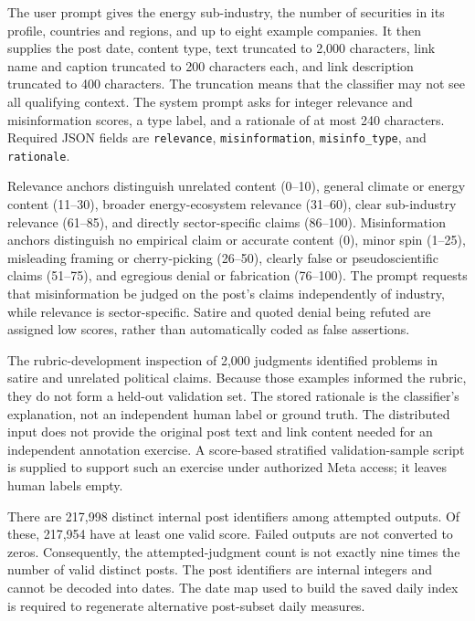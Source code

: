 \documentclass[11pt,a4paper]{article}
\begin{document}
The user prompt gives the energy sub-industry, the number of securities in its profile, countries and regions, and up to eight example companies. It then supplies the post date, content type, text truncated to 2,000 characters, link name and caption truncated to 200 characters each, and link description truncated to 400 characters. The truncation means that the classifier may not see all qualifying context. The system prompt asks for integer relevance and misinformation scores, a type label, and a rationale of at most 240 characters. Required JSON fields are \texttt{relevance}, \texttt{misinformation}, \texttt{misinfo\_type}, and \texttt{rationale}.

Relevance anchors distinguish unrelated content (0--10), general climate or energy content (11--30), broader energy-ecosystem relevance (31--60), clear sub-industry relevance (61--85), and directly sector-specific claims (86--100). Misinformation anchors distinguish no empirical claim or accurate content (0), minor spin (1--25), misleading framing or cherry-picking (26--50), clearly false or pseudoscientific claims (51--75), and egregious denial or fabrication (76--100). The prompt requests that misinformation be judged on the post's claims independently of industry, while relevance is sector-specific. Satire and quoted denial being refuted are assigned low scores, rather than automatically coded as false assertions.

The rubric-development inspection of 2,000 judgments identified problems in satire and unrelated political claims. Because those examples informed the rubric, they do not form a held-out validation set. The stored rationale is the classifier's explanation, not an independent human label or ground truth. The distributed input does not provide the original post text and link content needed for an independent annotation exercise. A score-based stratified validation-sample script is supplied to support such an exercise under authorized Meta access; it leaves human labels empty.

There are 217,998 distinct internal post identifiers among attempted outputs. Of these, 217,954 have at least one valid score. Failed outputs are not converted to zeros. Consequently, the attempted-judgment count is not exactly nine times the number of valid distinct posts. The post identifiers are internal integers and cannot be decoded into dates. The date map used to build the saved daily index is required to regenerate alternative post-subset daily measures.
\end{document}
